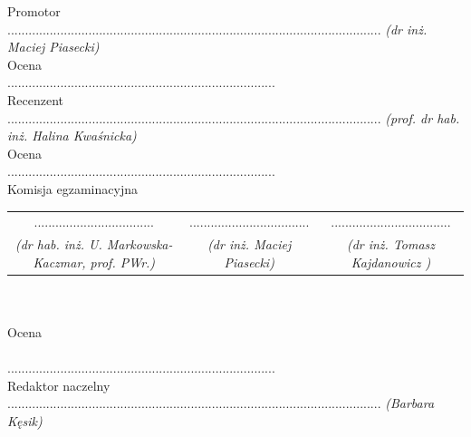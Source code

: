 \documentclass[a4paper, twoside, openright, 12pt]{report}
\begin{document}

\thispagestyle{empty}

\null\newpage

\thispagestyle{empty}
\cleardoublepage

\thispagestyle{empty}
\begin{center}
\thispagestyle{empty}
    \vfill
    \doublespacing
    \Large{Promotor} \\
    \singlespacing
    ..........................................................................................................
    \doublespacing
    \small\emph{(dr inż. Maciej Piasecki)} \\
    \large{Ocena} \\
    ............................................................................ \\
    \vspace{15mm}
    \Large{Recenzent} \\
    \singlespacing
    ..........................................................................................................
    \doublespacing
    \small\emph{(prof. dr hab. inż. Halina Kwaśnicka)} \\
    \large{Ocena} \\
    ............................................................................ \\

    \vspace{15mm}
    \Large{Komisja egzaminacyjna} \\
    \singlespacing
    \begin{tabular}{c c c}
    .................................. &  .................................. & .................................. \\
    \doublespacing
    \scriptsize\emph{(dr hab. inż. U. Markowska-Kaczmar, prof. PWr.)} & \scriptsize\emph{(dr inż. Maciej Piasecki)} & \scriptsize\emph{(dr inż. Tomasz Kajdanowicz )}\\
    \end{tabular}
    \\
    \hfill \\
    \large{Ocena} \\
    \hfill \\
    ............................................................................ \\

    \vspace{15mm}
    \Large{Redaktor naczelny} \\
    \singlespacing
    ..........................................................................................................
    \doublespacing
    \small\emph{(Barbara Kęsik)} \\
    \vfill
\end{center}
\thispagestyle{empty}
\cleardoublepage
\end{document}
